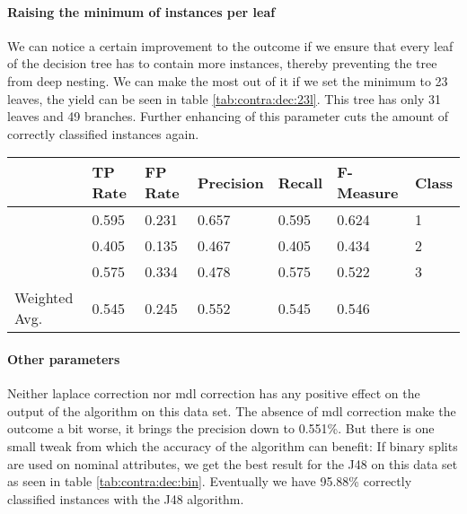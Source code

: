 \documentclass[paper=a4, fontsize=11pt]{scrartcl} %
\numberwithin{equation}{section} %
\numberwithin{figure}{section} %
\numberwithin{table}{section} %
\begin{document}
\paragraph{Raising the minimum of instances per leaf}
We can notice a certain improvement to the outcome if we ensure that every leaf of the decision tree has to contain more instances, thereby preventing the tree from deep nesting. We can make the most out of it if we set the minimum to 23 leaves, the yield can be seen in table \ref{tab:contra:dec:23l}. This tree has only 31 leaves and 49 branches. Further enhancing of this parameter cuts the amount of correctly classified instances again.


\begin{table*}[htb]\centering
  \begin{tabular*}{\columnwidth}{@{}lllllll@{}}
      \toprule 
              &   TP Rate & FP Rate & Precision & Recall & F-Measure &  Class \\ \midrule      
              &   0.595   & 0.231   & 0.657     & 0.595  & 0.624     &  1     \\      
              &   0.405   & 0.135   & 0.467     & 0.405  & 0.434     &  2     \\      
              &   0.575   & 0.334   & 0.478     & 0.575  & 0.522     &  3     \\      
Weighted Avg. &   0.545   & 0.245   & 0.552     & 0.545  & 0.546     &        \\ \bottomrule     
    \end{tabular*}
\caption{Decision Tree on Contraceptive Data Set -- at least 23 instances per leaf} 
\label{tab:contra:dec:23l}
\end{table*}
\FloatBarrier
\paragraph{Other parameters}
Neither laplace correction nor mdl correction has any positive effect on the output of the algorithm on this data set. The absence of mdl correction make the outcome a bit worse, it brings the precision down to 0.551\%.  But there is one small tweak from which the accuracy of the algorithm can benefit: If binary splits are used on nominal attributes, we get the best result for the J48 on this data set as seen in table \ref{tab:contra:dec:bin}. Eventually we have 95.88\% correctly
classified instances with the J48 algorithm. 
 
\end{document}
